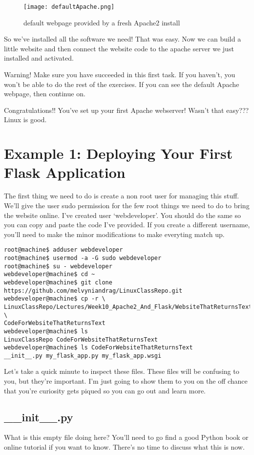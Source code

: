 \documentclass[10pt]{article}
\begin{document}
\begin{figure}[h]
  \centering
    \texttt{[image: defaultApache.png]}
  \caption{default webpage provided by a fresh Apache2 install}
	\label{fig:default}
\end{figure}

So we've installed all the software we need! That was easy. Now we can build a little website and then connect the website code to the apache server we just installed and activated.

{\Large \color{red} Warning! Make sure you have succeeded in this first task. If
you haven't, you won't be able to do the rest of the exercises. If you can see
the default Apache webpage, then continue on. }

Congratulations!! You've set up your first Apache webserver! Wasn't that easy???
Linux is good.

\section{Example 1: Deploying Your First Flask Application}
The first thing we need to do is create a non root user for managing this stuff. We'll give the user sudo permission for the few root things we need to do to bring the website online. I've created user `webdeveloper'. You should do the same so you can copy and paste the code I've provided. If you create a different username, you'll need to make the minor modifications to make everyting match up.

\begin{lstlisting}[style=term]
root@machine$ adduser webdeveloper
root@machine$ usermod -a -G sudo webdeveloper
root@machine$ su - webdeveloper
webdeveloper@machine$ cd ~
webdeveloper@machine$ git clone https://github.com/melvyniandrag/LinuxClassRepo.git
webdeveloper@machine$ cp -r \
LinuxClassRepo/Lectures/Week10_Apache2_And_Flask/WebsiteThatReturnsText/CodeForWebsiteThatReturnsText \
CodeForWebsiteThatReturnsText
webdeveloper@machine$ ls
LinuxClassRepo CodeForWebsiteThatReturnsText 
webdeveloper@machine$ ls CodeForWebsiteThatReturnsText
__init__.py my_flask_app.py my_flask_app.wsgi
\end{lstlisting}

Let's take a quick minute to inspect these files. These files will be confusing
to you, but they're important. I'm just going to show them to you on the off
chance that you're curiosity gets piqued so you can go out and learn more.

\subsection{\_\_init\_\_.py}
What is this empty file doing here? You'll need to go find a good Python book or
online tutorial if you want to know. There's no time to discuss what this is
now.
\end{document}
